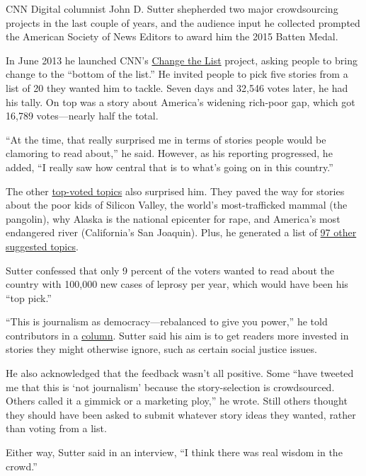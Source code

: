 \documentclass[notoc, symmetric, nobib, nols]{towcenter-guideto-book}
\begin{document}
CNN Digital columnist John D. Sutter shepherded two major crowdsourcing projects in the last couple of years, and the audience input he collected prompted the American Society of News Editors to award him the 2015 Batten Medal.

In June 2013 he launched CNN's \href{http://www.cnn.com/specials/opinion/change-the-list}{Change the List} project, asking people to bring change to the ``bottom of the list.''%
 He invited people to pick five stories from a list of 20 they wanted him to tackle. Seven days and 32,546 votes later, he had his tally. On top was a story about America's widening rich-poor gap, which got 16,789 votes---nearly half the total.

``At the time, that really surprised me in terms of stories people would be clamoring to read about,'' he said.%
 However, as his reporting progressed, he added, ``I really saw how central that is to what's going on in this country.''

The other \href{http://www.cnn.com/2013/06/18/opinion/sutter-ctl-vote-results/}{top-voted topics} also surprised him.\autocite{column} They paved the way for stories about the poor kids of Silicon Valley, the world's most-trafficked mammal (the pangolin), why Alaska is the national epicenter for rape, and America's most endangered river (California's San Joaquin). Plus, he generated a list of \href{http://www.cnn.com/2013/06/14/opinion/sutter-ctl-97-ideas/index.html?hpt=hp_c4}{97 other suggested topics}.\autocite{column} 

Sutter confessed that only 9 percent of the voters wanted to read about the country with 100,000 new cases of leprosy per year, which would have been his ``top pick.''

``This is journalism as democracy---rebalanced to give you power,'' he told contributors in a \href{http://www.cnn.com/2013/06/18/opinion/sutter-ctl-vote-results/index.html}{column}.\autocite{column} Sutter said his aim is to get readers more invested in stories they might otherwise ignore, such as certain social justice issues.  

He also acknowledged that the feedback wasn't all positive. Some 
``have tweeted me that this is ‘not journalism' because the story-selection is crowdsourced. Others called it a gimmick or a marketing ploy,'' he wrote.\autocite{column} Still others thought they should have been asked to submit whatever story ideas they wanted, rather than voting from a list. 

Either way, Sutter said in an interview, ``I think there was real wisdom in the crowd.''%
\end{document}
